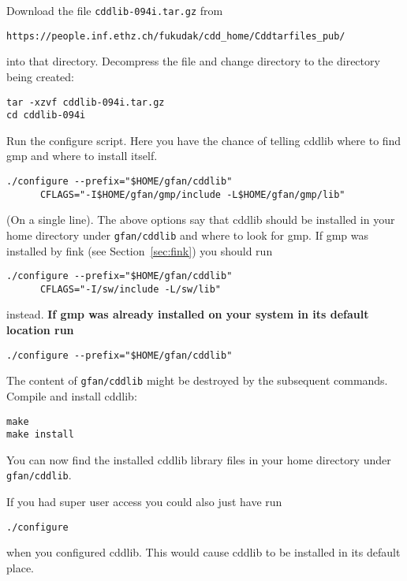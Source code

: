 \noindent
Download the file {\tt cddlib-094i.tar.gz} from
\begin{verbatim}
https://people.inf.ethz.ch/fukudak/cdd_home/Cddtarfiles_pub/
\end{verbatim}
into that directory.
Decompress the file and change directory to the directory being created:
\begin{verbatim}
tar -xzvf cddlib-094i.tar.gz
cd cddlib-094i
\end{verbatim}
Run the configure script. \color{black} Here you have the chance of telling cddlib where to find gmp and where to install itself.
\begin{verbatim}
./configure --prefix="$HOME/gfan/cddlib"
      CFLAGS="-I$HOME/gfan/gmp/include -L$HOME/gfan/gmp/lib"
\end{verbatim}
(On a single line).
The above options say that cddlib should be installed in your home directory under {\tt gfan/cddlib} and where to look for gmp. If gmp was installed by fink (see Section~\ref{sec:fink}) you should run
\begin{verbatim}
./configure --prefix="$HOME/gfan/cddlib"
      CFLAGS="-I/sw/include -L/sw/lib"
\end{verbatim}
instead. {\bf If gmp was already installed on your system in its default location run}
\color{red}
\begin{verbatim}
./configure --prefix="$HOME/gfan/cddlib"
\end{verbatim}
\color{black}
The content of {\tt gfan/cddlib} might be destroyed by the subsequent commands.
Compile and install cddlib:
\color{red}
\begin{verbatim}
make
make install
\end{verbatim}
\color{black}
You can now find the installed cddlib library files in your home directory under {\tt gfan/cddlib}.

\noindent
If you had super user access you could also just have run
\begin{verbatim}
./configure
\end{verbatim}
when you configured cddlib. This would cause cddlib to be installed in its default place.

